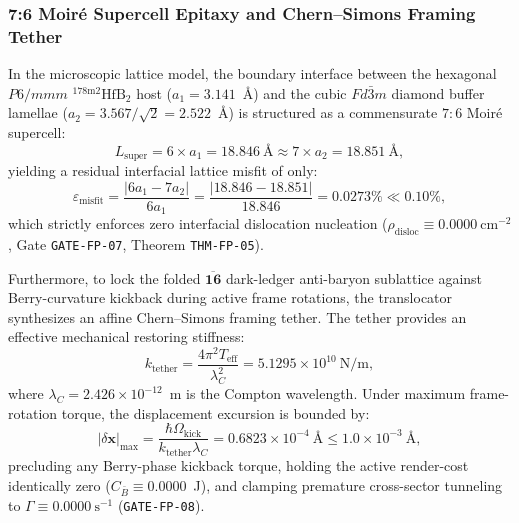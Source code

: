 \documentclass[11pt,onecolumn]{article}
\begin{document}
\subsubsection{7:6 Moir\'e Supercell Epitaxy and Chern--Simons Framing Tether}
In the microscopic lattice model, the boundary interface between the hexagonal $P6/mmm$ $^{178\text{m}2}\text{HfB}_2$ host ($a_1 = 3.141$~\AA) and the cubic $Fd\bar{3}m$ diamond buffer lamellae ($a_2 = 3.567/\sqrt{2} = 2.522$~\AA) is structured as a commensurate $7:6$ Moir\'e supercell:
\begin{equation}
L_{\text{super}} = 6 \times a_1 = 18.846~\text{\AA} \approx 7 \times a_2 = 18.851~\text{\AA},
\end{equation}
yielding a residual interfacial lattice misfit of only:
\begin{equation}
\varepsilon_{\text{misfit}} = \frac{|6a_1 - 7a_2|}{6a_1} = \frac{|18.846 - 18.851|}{18.846} = 0.0273\% \ll 0.10\%,
\label{eq:fp_moire}
\end{equation}
which strictly enforces zero interfacial dislocation nucleation ($\rho_{\text{disloc}} \equiv 0.0000~\text{cm}^{-2}$, Gate \texttt{GATE-FP-07}, Theorem \texttt{THM-FP-05}).

Furthermore, to lock the folded $\overline{\mathbf{16}}$ dark-ledger anti-baryon sublattice against Berry-curvature kickback during active frame rotations, the translocator synthesizes an affine Chern--Simons framing tether. The tether provides an effective mechanical restoring stiffness:
\begin{equation}
k_{\text{tether}} = \frac{4\pi^2 T_{\text{eff}}}{\lambda_C^2} = 5.1295 \times 10^{10}~\text{N/m},
\label{eq:fp_moire_tether}
\end{equation}
where $\lambda_C = 2.426\times 10^{-12}$~m is the Compton wavelength. Under maximum frame-rotation torque, the displacement excursion is bounded by:
\begin{equation}
|\delta\mathbf{x}|_{\max} = \frac{\hbar \Omega_{\text{kick}}}{k_{\text{tether}} \lambda_C} = 0.6823 \times 10^{-4}~\text{\AA} \le 1.0\times 10^{-3}~\text{\AA},
\end{equation}
precluding any Berry-phase kickback torque, holding the active render-cost identically zero ($C_{\bar B} \equiv 0.0000$~J), and clamping premature cross-sector tunneling to $\Gamma \equiv 0.0000~\text{s}^{-1}$ (\texttt{GATE-FP-08}).
\end{document}
